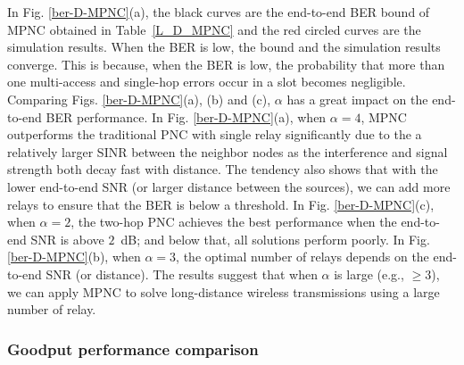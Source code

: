 In Fig. \ref{ber-D-MPNC}(a), the black curves are the  end-to-end BER bound of MPNC obtained in Table~\ref{L_D_MPNC} and the red circled curves are the simulation results. When the BER is low, the bound and the simulation results converge. This is because,  when the BER is low, the probability that  more than one multi-access and single-hop errors occur in a slot becomes negligible. Comparing Figs. \ref{ber-D-MPNC}(a), (b) and (c),  $\alpha$ has a great impact on the end-to-end BER performance. In Fig. \ref{ber-D-MPNC}(a), when $\alpha=4$, MPNC outperforms the traditional PNC with single relay significantly due to the a relatively larger SINR between the neighbor nodes as the interference and signal strength both decay fast with distance. The tendency also shows that with the lower end-to-end SNR (or larger distance between the sources), we can add more relays to ensure that the BER is below a threshold.
In Fig. \ref{ber-D-MPNC}(c), when $\alpha=2$, the two-hop PNC achieves the best performance when the end-to-end SNR is above $2$~dB; and below that, all solutions perform poorly.  
In Fig. \ref{ber-D-MPNC}(b), when $\alpha=3$, the optimal number of relays depends on the end-to-end SNR (or distance). 
The results suggest that when $\alpha$ is large (e.g., $\ge3$), we can apply MPNC to solve long-distance wireless transmissions using a large number of relay. 

\fi




\subsubsection{Goodput performance comparison} %
\label{sub:throughput}


